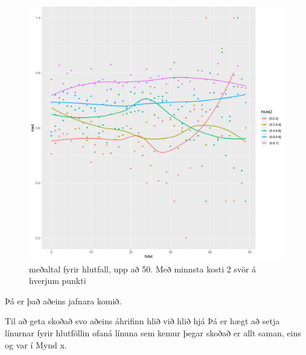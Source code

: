 \documentclass[
  12pt,
]{article}
\begin{document}
\begin{figure}[H]

{\centering \includegraphics[width=1\linewidth]{Img/meanbyhlutfallLim} 

}

\caption{meðaltal fyrir hlutfall, upp að 50. Með minnsta kosti 2 svör á hverjum punkti}\label{fig:meanbyhlutfall50Lim}
\end{figure}

Þá er það aðeins jafnara komið.

Til að geta skoðað svo aðeins áhrifinn hlið við hlið hjá Þá er hægt að setja línurnar fyrir hlutföllin ofaná línuna sem kemur þegar skoðað er allt saman, eins og var í Mynd x.
\end{document}
